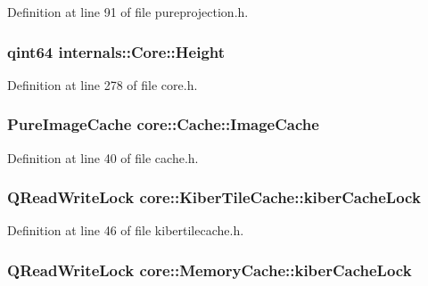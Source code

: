 \-Definition at line 91 of file pureprojection.\-h.

\hypertarget{group___o_p_map_widget_ga9a5a3c48699aba8ef9582514fca243f0}{
\subsubsection[{\-Height}]{\setlength{\rightskip}{0pt plus 5cm}qint64 {\bf internals\-::\-Core\-::\-Height}}}\label{group___o_p_map_widget_ga9a5a3c48699aba8ef9582514fca243f0}


\-Definition at line 278 of file core.\-h.

\hypertarget{group___o_p_map_widget_gab71cf242d304174673b1385ade1915bd}{
\subsubsection[{\-Image\-Cache}]{\setlength{\rightskip}{0pt plus 5cm}\-Pure\-Image\-Cache {\bf core\-::\-Cache\-::\-Image\-Cache}}}\label{group___o_p_map_widget_gab71cf242d304174673b1385ade1915bd}


\-Definition at line 40 of file cache.\-h.

\hypertarget{group___o_p_map_widget_ga33731aa2cecd7ba1200e9871f3380308}{
\subsubsection[{kiber\-Cache\-Lock}]{\setlength{\rightskip}{0pt plus 5cm}\-Q\-Read\-Write\-Lock {\bf core\-::\-Kiber\-Tile\-Cache\-::kiber\-Cache\-Lock}}}\label{group___o_p_map_widget_ga33731aa2cecd7ba1200e9871f3380308}


\-Definition at line 46 of file kibertilecache.\-h.

\hypertarget{group___o_p_map_widget_ga9c5f2537ff4510c8890590e73ea95b65}{
\subsubsection[{kiber\-Cache\-Lock}]{\setlength{\rightskip}{0pt plus 5cm}\-Q\-Read\-Write\-Lock {\bf core\-::\-Memory\-Cache\-::kiber\-Cache\-Lock}}}\label{group___o_p_map_widget_ga9c5f2537ff4510c8890590e73ea95b65}


